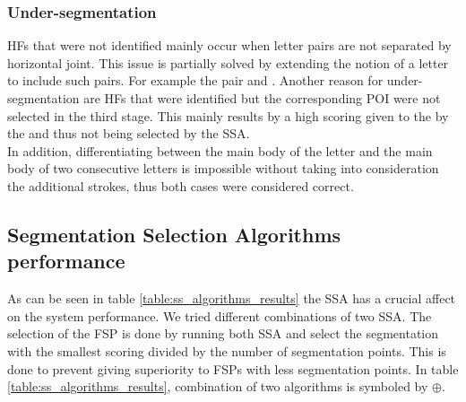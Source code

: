 \documentclass[10pt, conference, compsocconf]{IEEEtran}
\begin{document}

\subsubsection{Under-segmentation}
HFs that were not identified  mainly occur when letter pairs are not separated by horizontal joint. 
This issue is partially solved by extending the notion of a letter to include such pairs. For example the pair  and .
Another reason for under-segmentation are HFs that were identified but the corresponding POI were not selected in the third stage. 
This mainly results by a high scoring given to the  by the  and thus not being selected by the SSA.\\

In addition, differentiating between the main body of the letter  and the main body of two consecutive  letters is impossible without taking into consideration the additional strokes, thus both cases were considered correct.


\subsection{Segmentation Selection Algorithms performance}
\label{subsec:ssa_performance}
As can be seen in table \ref{table:ss_algorithms_results} the SSA has a crucial affect on the system performance. We tried different combinations of two SSA. The selection of the FSP is done by running both SSA and select the segmentation with the smallest scoring divided by the number of segmentation points. This is done to prevent giving superiority to FSPs with less segmentation points. In table \ref{table:ss_algorithms_results}, combination of two algorithms is symboled by $\oplus$.
\end{document}
